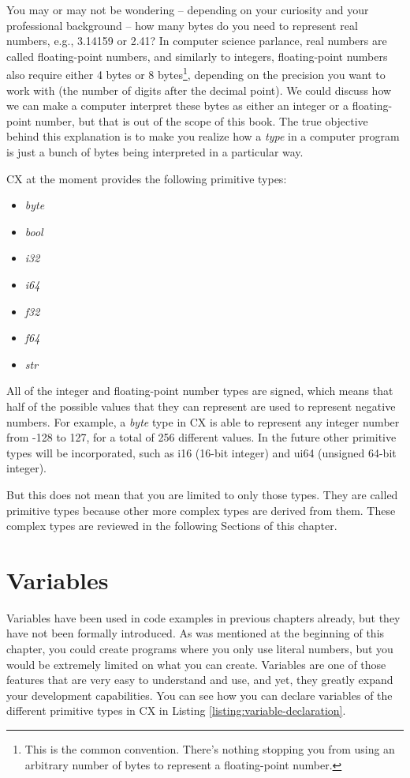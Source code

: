 \documentclass[11pt,fleqn,openany]{book} %
\begin{document}
You may or may not be wondering -- depending on your curiosity and your professional background -- how many bytes do you need to represent real numbers, e.g., 3.14159 or 2.41? In computer science parlance, real numbers are called floating-point numbers, and similarly to integers, floating-point numbers also require either 4 bytes or 8 bytes\footnote{This is the common convention. There's nothing stopping you from using an arbitrary number of bytes to represent a floating-point number.}, depending on the precision you want to work with (the number of digits after the decimal point). We could discuss how we can make a computer interpret these bytes as either an integer or a floating-point number, but that is out of the scope of this book. The true objective behind this explanation is to make you realize how a \emph{type} in a computer program is just a bunch of bytes being interpreted in a particular way.

CX at the moment provides the following primitive types:
\begin{itemize}
    \item \textit{byte}
    \item \textit{bool}
    \item \textit{i32}
    \item \textit{i64}
    \item \textit{f32}
    \item \textit{f64}
    \item \textit{str}
\end{itemize}

All of the integer and floating-point number types are signed, which means that half of the possible values that they can represent are used to represent negative numbers. For example, a \textit{byte} type in CX is able to represent any integer number from -128 to 127, for a total of 256 different values. In the future other primitive types will be incorporated, such as i16 (16-bit integer) and ui64 (unsigned 64-bit integer).

But this does not mean that you are limited to only those types. They are called primitive types because other more complex types are derived from them. These complex types are reviewed in the following Sections of this chapter.

\section{Variables}

Variables have been used in code examples in previous chapters already, but they have not been formally introduced. As was mentioned at the beginning of this chapter, you could create programs where you only use literal numbers, but you would be extremely limited on what you can create. Variables are one of those features that are very easy to understand and use, and yet, they greatly expand your development capabilities. You can see how you can declare variables of the different primitive types in CX in Listing \ref{listing:variable-declaration}.
\end{document}
